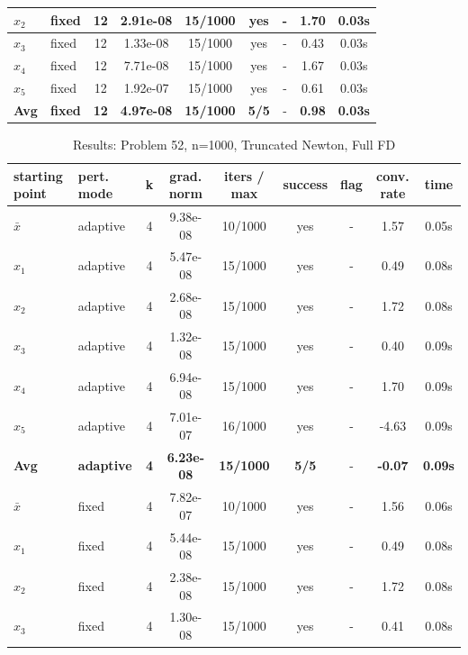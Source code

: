 \begin{longtable}{|l|l|c|c|c|c|c|c|c|}
\hline
$x_2$ & fixed & 12 & 2.91e-08 & 15/1000 & yes & - & 1.70 & 0.03s \\
\hline
$x_3$ & fixed & 12 & 1.33e-08 & 15/1000 & yes & - & 0.43 & 0.03s \\
\hline
$x_4$ & fixed & 12 & 7.71e-08 & 15/1000 & yes & - & 1.67 & 0.03s \\
\hline
$x_5$ & fixed & 12 & 1.92e-07 & 15/1000 & yes & - & 0.61 & 0.03s \\
\hline
\hline\hline
\textbf{Avg} & \textbf{fixed} & \textbf{12} & \textbf{4.97e-08} & \textbf{15/1000} & \textbf{5/5} & - & \textbf{0.98} & \textbf{0.03s} \\
\hline\hline
\end{longtable}


\begin{longtable}{|l|l|c|c|c|c|c|c|c|}
\caption{Results: Problem 52, n=1000, Truncated Newton, Full FD} \\
\hline
\textbf{starting point} & \textbf{pert. mode} & \textbf{k} & \textbf{grad. norm} & \textbf{iters / max} & \textbf{success} & \textbf{flag} & \textbf{conv. rate} & \textbf{time} \\
\hline
\endfirsthead
\endhead
\endfoot
\hline
\endlastfoot
$\bar{x}$ & adaptive & 4 & 9.38e-08 & 10/1000 & yes & - & 1.57 & 0.05s \\
\hline
$x_1$ & adaptive & 4 & 5.47e-08 & 15/1000 & yes & - & 0.49 & 0.08s \\
\hline
$x_2$ & adaptive & 4 & 2.68e-08 & 15/1000 & yes & - & 1.72 & 0.08s \\
\hline
$x_3$ & adaptive & 4 & 1.32e-08 & 15/1000 & yes & - & 0.40 & 0.09s \\
\hline
$x_4$ & adaptive & 4 & 6.94e-08 & 15/1000 & yes & - & 1.70 & 0.09s \\
\hline
$x_5$ & adaptive & 4 & 7.01e-07 & 16/1000 & yes & - & -4.63 & 0.09s \\
\hline
\hline\hline
\textbf{Avg} & \textbf{adaptive} & \textbf{4} & \textbf{6.23e-08} & \textbf{15/1000} & \textbf{5/5} & - & \textbf{-0.07} & \textbf{0.09s} \\
\hline\hline
\hline
$\bar{x}$ & fixed & 4 & 7.82e-07 & 10/1000 & yes & - & 1.56 & 0.06s \\
\hline
$x_1$ & fixed & 4 & 5.44e-08 & 15/1000 & yes & - & 0.49 & 0.08s \\
\hline
$x_2$ & fixed & 4 & 2.38e-08 & 15/1000 & yes & - & 1.72 & 0.08s \\
\hline
$x_3$ & fixed & 4 & 1.30e-08 & 15/1000 & yes & - & 0.41 & 0.08s \\

\end{longtable}
